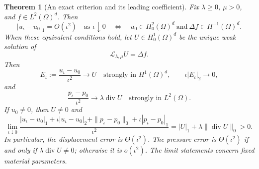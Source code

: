 \documentclass[11pt,a4paper]{article}
\newtheorem{theorem}{Theorem}[section]
\theoremstyle{remark}
\numberwithin{equation}{section}
\begin{document}
\begin{theorem}[An exact criterion and its leading coefficient]
\label{comp:criterion}
Fix $\lambda\ge0$, $\mu>0$, and $f\in L^2(\Omega)^d$. Then
\begin{equation}\label{comp:iff}
 |u_\iota-u_0|_1=O(\iota^2)\quad\text{as }\iota\downarrow0
 \quad\Longleftrightarrow\quad
 u_0\in H^2_0(\Omega)^d\ \text{and}\ \Delta f\in H^{-1}(\Omega)^d.
\end{equation}
When these equivalent conditions hold, let $U\in H^1_0(\Omega)^d$ be the
unique weak solution of
\[
 \mathcal L_{\lambda,\mu}U=\Delta f.
\]
Then
\begin{equation}\label{comp:strong-leading}
 E_\iota:=\frac{u_\iota-u_0}{\iota^2}\longrightarrow U
       \quad\text{strongly in }H^1(\Omega)^d,
 \qquad \iota|E_\iota|_2\longrightarrow0,
\end{equation}
and
\begin{equation}\label{comp:pressure-leading}
 \frac{p_\iota-p_0}{\iota^2}
 \longrightarrow\lambda\operatorname{div}U
       \quad\text{strongly in }L^2(\Omega).
\end{equation}
If $u_0\ne0$, then $U\ne0$ and
\begin{equation}\label{comp:four-limit}
 \lim_{\iota\downarrow0}
 \frac{|u_\iota-u_0|_1+\iota|u_\iota-u_0|_2
       +\|p_\iota-p_0\|_0+\iota|p_\iota-p_0|_1}{\iota^2}
 =|U|_1+\lambda\|\operatorname{div}U\|_0>0.
\end{equation}
In particular, the displacement error is $\Theta(\iota^2)$. The pressure
error is $\Theta(\iota^2)$ if and only if
$\lambda\operatorname{div}U\ne0$; otherwise it is $o(\iota^2)$.
The limit statements concern fixed material parameters.
\end{theorem}
\end{document}
